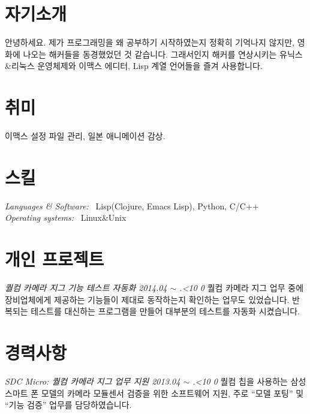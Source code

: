 \documentclass[line,margin]{res}
\renewcommand{\today}{\number\year.\ifnum\number\month<10 0\fi \number\month}
\begin{document}
\address{E-mail: vmfhrmfoaj@yahoo.com}


\begin{resume}

  \section{자기소개}

  안녕하세요.
  제가 프로그래밍을 왜 공부하기 시작하였는지 정확히 기억나지 않지만, 영화에 나오는 해커들을 동경했었던 것 같습니다.
  그래서인지 해커를 연상시키는 유닉스\&리눅스 운영체제와 이맥스 에디터, Lisp 계열 언어들을 즐겨 사용합니다.


  \section{취미}

  이맥스 설정 파일 관리, 일본 애니메이션 감상.


  \section{스킬}

  {\sl Languages \& Software:} ~Lisp({\small Clojure, Emacs Lisp}), Python, C/C++ \\
  {\sl Operating systems:} ~Linux\&Unix


  \section{개인 프로젝트}

  {\sl 퀄컴 카메라 지그 기능 테스트 자동화 \hfill 2014.04 $\sim$ \today}
  \vspace{1mm}
  \newline
  {
    \small
    퀄컴 카메라 지그 업무 중에 장비업체에게 제공하는 기능들이 제대로 동작하는지 확인하는 업무도 있었습니다.
    반복되는 테스트를 대신하는 프로그램을 만들어 대부분의 테스트를 자동화 시켰습니다.
  }


  \section{경력사항}

  {\sl SDC Micro: 퀄컴 카메라 지그 업무 지원 \hfill 2013.04 $\sim$ \today}
  \vspace{1mm}
  \newline
  {
    \small
    퀄컴 칩을 사용하는 삼성 스마트 폰 모델의 카메라 모듈센서 검증을 위한 소프트웨어 지원,
    주로 ``모델 포팅'' 및 ``기능 검증'' 업무를 담당하였습니다.
  }


\end{resume}
\end{document}
